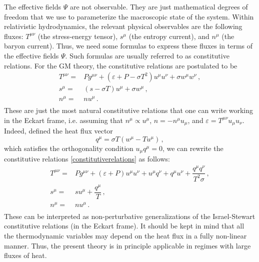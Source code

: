 \documentclass[a4paper, amsfonts, amssymb, amsmath, reprint, showkeys, nofootinbib, twoside, onecolumn, notitlepage]{revtex4-1}
\begin{document}
The effective fields $\Psi$ are not observable. They are just mathematical degrees of freedom that we use to parameterize the macroscopic state of the system. Within relativistic hydrodynamics, the relevant physical observables are the following fluxes: $T^{\mu \nu}$ (the stress-energy tensor), $s^\mu$ (the entropy current), and $n^\mu$ (the baryon current). Thus, we need some formulas to express these fluxes in terms of the effective fields $\Psi$. Such formulas are usually referred to as constitutive relations. For the GM theory, the constitutive relations are postulated to be
\begin{equation}\label{constitutiverelations}
    \begin{split}
T^{\mu \nu}={}& P g^{\mu \nu}+(\varepsilon+P-\sigma T^2)u^\mu u^\nu +\sigma w^\mu w^\nu \, , \\
s^\mu ={}& (s-\sigma T)u^\mu +\sigma w^\mu \, , \\
n^\mu ={}& n u^\mu \, . \\
    \end{split}
\end{equation}
These are just the most natural constitutive relations that one can write working in the Eckart frame, i.e. assuming that $n^\mu \propto u^\mu$, $n=-n^\mu u_\mu$, and $\varepsilon=T^{\mu \nu}u_\mu u_\nu$. Indeed, defined the heat flux vector
\begin{equation}\label{heatflux}
    q^\mu =\sigma T (w^\mu {-}Tu^\mu) \, ,
\end{equation}
which satisfies the orthogonality condition $u_\mu q^\mu =0$, we can rewrite the constitutive relations \eqref{constitutiverelations} as follows:
\begin{equation}\label{constitutiverelations2}
    \begin{split}
T^{\mu \nu}={}& P g^{\mu \nu}+(\varepsilon+P)u^\mu u^\nu+u^\mu q^\nu +q^\mu u^\nu  +\dfrac{q^\mu q^\nu}{T^2 \sigma} \, , \\
s^\mu ={}& s u^\mu +\dfrac{q^\mu}{T} \, , \\
n^\mu ={}& n u^\mu \, . \\
    \end{split}
\end{equation}
These can be interpreted as non-perturbative generalizations of the Israel-Stewart constitutive relations \cite{Hishcock1983,OlsonRegular1990,PriouCOMPAR1991} (in the Eckart frame). It should be kept in mind that all the thermodynamic variables may depend on the heat flux in a fully non-linear manner. Thus, the present theory is in principle applicable in regimes with large fluxes of heat.
\end{document}
